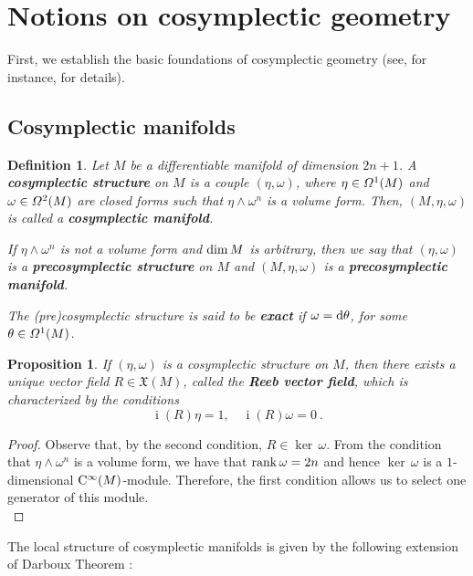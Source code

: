 \documentclass[12pt]{report}
\newtheorem{prop}[teor]{Proposition}
\newtheorem{definition}[teor]{Definition}
\def\beq{\begin{equation}}
\def\eeq{\end{equation}}
\def\qed{\ifvmode\removelastskip\fi
{\unskip\nobreak\hfil\penalty50\hbox{}\nobreak\hfil
\hbox{\vrule height1.2ex width1.2ex}\parfillskip=0pt
\finalhyphendemerits=0 \par\smallskip}}
\def\vf{\mathfrak X}
\def\df{{\mit\Omega}}
\def\d{{\rm d}}
\def\inn{\mathop{i}\nolimits}
\def\Cinfty{{\rm C}^\infty}
\begin{document}
\section{Notions on cosymplectic geometry}


First, we establish the basic foundations of
cosymplectic geometry 
(see, for instance, \cite{CLL-92,dN-2013,CLM-91} for details).


\subsection{Cosymplectic manifolds}


\begin{definition}
\label{deest}
Let $M$ be a differentiable manifold of dimension $2n+1$.
A \textbf{cosymplectic structure}  on $M$ is a couple
$(\eta,\omega)$, where $\eta\in\df^1(M)$ and $\omega\in\df^2(M)$
are closed forms such that
$\eta\wedge\omega^n$ is a volume form.
Then, $(M,\eta,\omega)$ is called a  \textbf{cosymplectic manifold}.

If $\eta\wedge\omega^n$ is not a volume form
and ${\rm dim}\,M$ is arbitrary, then we say that $(\eta,\omega)$
is a \textbf{precosymplectic structure}  on $M$ and
$(M,\eta,\omega)$ is a  \textbf{precosymplectic manifold}.

The (pre)cosymplectic structure is said to be \textbf{exact} if 
$\omega =\d \theta$, for some $\theta\in\df^1(M)$.
\end{definition}

\begin{prop}
If $(\eta ,\omega)$ is a cosymplectic structure on $M$,
then there exists a unique vector field
$R\in\vf(M)$, called the \textbf{Reeb vector field},
which is characterized by the conditions
\beq
\inn(R)\eta=1 ,\quad \inn(R)\omega=0 \ .
\label{rvf}
\eeq
\end{prop}
\begin{proof}
Observe that, by the second condition, $R\in\ker\,\omega$.
From the condition that $\eta\wedge\omega^n$ is a volume form,
we have that ${\rm rank}\,\omega=2n$ and hence
$\ker\,\omega$ is a $1$-dimensional $\Cinfty(M)$-module.
Therefore, the first condition allows us to select one generator of this module.
\\ \qed \end{proof}

The local structure of cosymplectic manifolds is given by the following extension of Darboux Theorem  \cite{dLe89,dLGRR-2023}:
\end{document}
